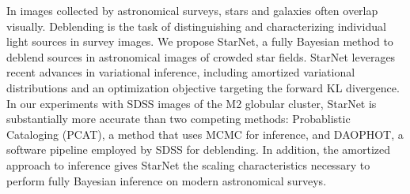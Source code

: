 In images collected by astronomical surveys, stars and galaxies often overlap visually.
Deblending is the task of distinguishing and characterizing individual light sources in survey images.
We propose StarNet, a fully Bayesian method to deblend sources in astronomical images of crowded star fields.
StarNet leverages recent advances in variational inference,
including amortized variational distributions and
an optimization objective targeting the forward KL divergence.
In our experiments with SDSS images of the M2 globular cluster, StarNet is substantially more accurate than two competing methods: Probablistic Cataloging (PCAT), a method that uses MCMC for inference, and DAOPHOT, a software pipeline employed by SDSS for deblending.
In addition, the amortized approach to inference 
gives StarNet the scaling characteristics necessary to perform fully Bayesian inference on modern astronomical surveys.

